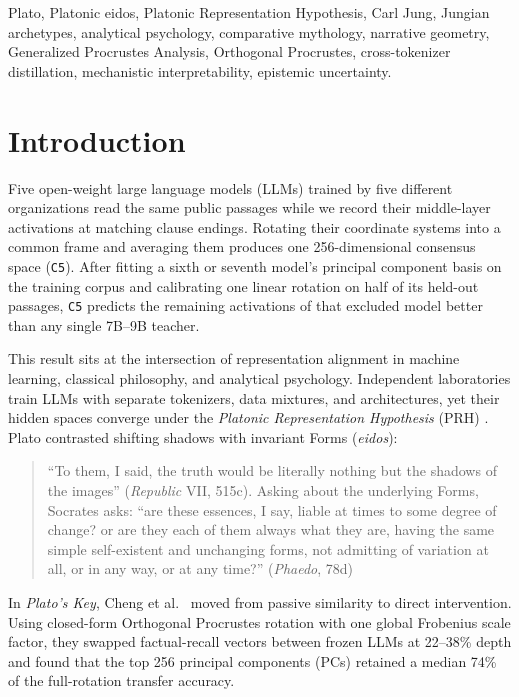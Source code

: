 \documentclass[conference]{IEEEtran}
\begin{document}
\begin{IEEEkeywords}
Plato, Platonic eidos, Platonic Representation Hypothesis, Carl Jung, Jungian archetypes, analytical psychology, comparative mythology, narrative geometry, Generalized Procrustes Analysis, Orthogonal Procrustes, cross-tokenizer distillation, mechanistic interpretability, epistemic uncertainty.
\end{IEEEkeywords}

\section{Introduction}
Five open-weight large language models (LLMs) trained by five different organizations read the same public passages while we record their middle-layer activations at matching clause endings. Rotating their coordinate systems into a common frame and averaging them produces one 256-dimensional consensus space (\texttt{C5}). After fitting a sixth or seventh model's principal component basis on the training corpus and calibrating one linear rotation on half of its held-out passages, \texttt{C5} predicts the remaining activations of that excluded model better than any single 7B--9B teacher.

This result sits at the intersection of representation alignment in machine learning, classical philosophy, and analytical psychology. Independent laboratories train LLMs with separate tokenizers, data mixtures, and architectures, yet their hidden spaces converge under the \textit{Platonic Representation Hypothesis} (PRH) \cite{huh2024platonic,balestriero2026proving}. Plato contrasted shifting shadows with invariant Forms (\textit{eidos}):
\begin{quote}
\small
``To them, I said, the truth would be literally nothing but the shadows of the images'' (\textit{Republic} VII, 515c). Asking about the underlying Forms, Socrates asks: ``are these essences, I say, liable at times to some degree of change? or are they each of them always what they are, having the same simple self-existent and unchanging forms, not admitting of variation at all, or in any way, or at any time?'' \cite{plato1892dialogues} (\textit{Phaedo}, 78d)
\end{quote}
In \textit{Plato's Key}, Cheng et al.~\cite{cheng2026platoskey} moved from passive similarity to direct intervention. Using closed-form Orthogonal Procrustes rotation \cite{schonemann1966procrustes} with one global Frobenius scale factor, they swapped factual-recall vectors between frozen LLMs at 22--38\% depth and found that the top 256 principal components (PCs) retained a median 74\% of the full-rotation transfer accuracy.
\end{document}
